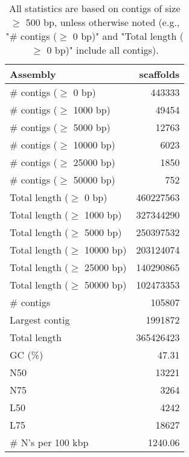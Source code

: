 \documentclass[12pt,a4paper]{article}
\begin{document}
\begin{table}[ht]
\begin{center}
\caption{All statistics are based on contigs of size $\geq$ 500 bp, unless otherwise noted (e.g., "\# contigs ($\geq$ 0 bp)" and "Total length ($\geq$ 0 bp)" include all contigs).}
\begin{tabular}{|l*{1}{|r}|}
\hline
Assembly & scaffolds \\ \hline
\# contigs ($\geq$ 0 bp) & 443333 \\ \hline
\# contigs ($\geq$ 1000 bp) & 49454 \\ \hline
\# contigs ($\geq$ 5000 bp) & 12763 \\ \hline
\# contigs ($\geq$ 10000 bp) & 6023 \\ \hline
\# contigs ($\geq$ 25000 bp) & 1850 \\ \hline
\# contigs ($\geq$ 50000 bp) & 752 \\ \hline
Total length ($\geq$ 0 bp) & 460227563 \\ \hline
Total length ($\geq$ 1000 bp) & 327344290 \\ \hline
Total length ($\geq$ 5000 bp) & 250397532 \\ \hline
Total length ($\geq$ 10000 bp) & 203124074 \\ \hline
Total length ($\geq$ 25000 bp) & 140290865 \\ \hline
Total length ($\geq$ 50000 bp) & 102473353 \\ \hline
\# contigs & 105807 \\ \hline
Largest contig & 1991872 \\ \hline
Total length & 365426423 \\ \hline
GC (\%) & 47.31 \\ \hline
N50 & 13221 \\ \hline
N75 & 3264 \\ \hline
L50 & 4242 \\ \hline
L75 & 18627 \\ \hline
\# N's per 100 kbp & 1240.06 \\ \hline
\end{tabular}
\end{center}
\end{table}
\end{document}
